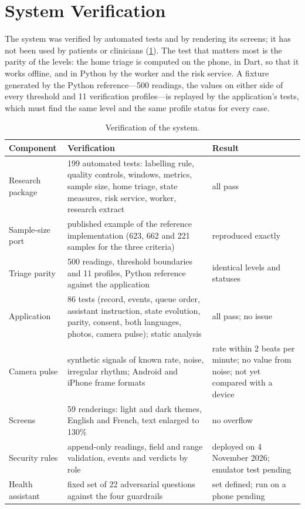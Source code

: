 \section{System Verification}\label{sec:results-system}

The system was verified by automated tests and by rendering its screens; it has not been used by patients or clinicians (\cref{tab:verification}). The test that matters most is the parity of the levels: the home triage is computed on the phone, in Dart, so that it works offline, and in Python by the worker and the risk service. A fixture generated by the Python reference---500 readings, the values on either side of every threshold and 11 verification profiles---is replayed by the application's tests, which must find the same level and the same profile status for every case.

\begin{table}[htbp]
\centering\footnotesize
\caption{Verification of the system.}\label{tab:verification}
\begin{tabularx}{\textwidth}{@{}>{\raggedright\arraybackslash}p{3.4cm} X >{\raggedright\arraybackslash}p{3.3cm}@{}}
\toprule
\textbf{Component} & \textbf{Verification} & \textbf{Result} \\
\midrule
Research package & 199 automated tests: labelling rule, quality controls, windows, metrics, sample size, home triage, state measures, risk service, worker, research extract & all pass \\
Sample-size port & published example of the reference implementation (623, 662 and 221 samples for the three criteria) & reproduced exactly \\
Triage parity & 500 readings, threshold boundaries and 11 profiles, Python reference against the application & identical levels and statuses \\
Application & 86 tests (record, events, queue order, assistant instruction, state evolution, parity, consent, both languages, photos, camera pulse); static analysis & all pass; no issue \\
Camera pulse & synthetic signals of known rate, noise, irregular rhythm; Android and iPhone frame formats & rate within 2 beats per minute; no value from noise; not yet compared with a device \\
Screens & 59 renderings: light and dark themes, English and French, text enlarged to 130\% & no overflow \\
Security rules & append-only readings, field and range validation, events and verdicts by role & deployed on 4 November 2026; emulator test pending \\
Health assistant & fixed set of 22 adversarial questions against the four guardrails & set defined; run on a phone pending \\
\bottomrule
\end{tabularx}
\end{table}


